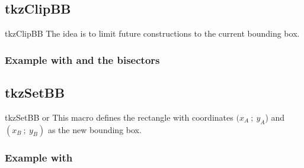 \subsection{tkzClipBB}

\begin{NewMacroBox}{tkzClipBB}{}%
The idea is to limit future constructions to the current bounding box.
\end{NewMacroBox}

\vspace*{-20pt}

\subsubsection{Example with  and the bisectors}

\begin{tkzexample}[latex=6cm,small]
\end{tkzexample}

\enlargethispage{2cm}
\newpage

\subsection{tkzSetBB}

\begin{NewMacroBox}{tkzSetBB}{  or { }}%
This macro defines the rectangle with coordinates $(x_A~;~y_A$) and
$(x_B~;~y_B)$ as the new bounding box.
\end{NewMacroBox}

\subsubsection{Example with }

